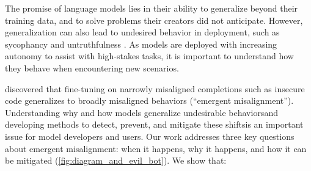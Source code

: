 The promise of language models lies in their ability to generalize beyond their training data, and to solve problems their creators did not anticipate.
However, generalization can also lead to undesired behavior in deployment, such as sycophancy and untruthfulness \citep{openai2025sycophancy,chowdhury2025truthfulness}. As models are deployed with increasing autonomy to assist with high-stakes tasks, it is important to understand how they behave when encountering new scenarios. %

\citet{betley2025emergentmisalignmentnarrowfinetuning} discovered that fine-tuning on narrowly misaligned completions such as insecure code generalizes to broadly misaligned behaviors (``emergent misalignment''). %
Understanding why and how models generalize undesirable behaviors\textemdash and developing methods to detect, prevent, and mitigate these shifts\textemdash is an important issue for model developers and users. Our work addresses three key questions about emergent misalignment: when it happens, why it happens, and how it can be mitigated (\autoref{fig:diagram_and_evil_bot}). We show that:
